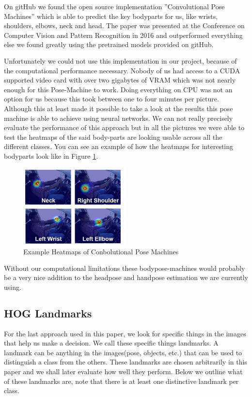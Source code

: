\documentclass[10pt,twocolumn,letterpaper]{article}
\begin{document}
On gitHub we found the open source implementation ''Convolutional Pose Machines'' which is able to predict the key bodyparts for us, like wrists, shoulders, elbows, neck and head.\cite{DBLP:journals/corr/WeiRKS16} The paper was presented at the Conference on Computer Vision and Pattern Recognition in 2016 and outperformed everything else we found greatly using the pretrained models provided on gitHub. 

Unfortunately we could not use this implementation in our project, because of the computational performance necessary. Nobody of us had access to a CUDA supported video card with over two gigabytes of VRAM which was not nearly enough for this Pose-Machine to work. Doing everything on CPU was not an option for us because this took between one to four minutes per picture. Although this at least made it possible to take a look at the results this pose machine is able to achieve using neural networks. We can not really precisely evaluate the performance of this approach but in all the pictures we were able to test the heatmaps of the said body-parts are looking usable across all the different classes. You can see an example of how the heatmaps for interesting bodyparts look like in Figure \ref{BodyPoseExample}.\\
\begin{figure}[h]
    \centering
    \includegraphics[width=0.5\textwidth]{BodyPoseExample}
    \caption{Example Heatmaps of Conbolutional Pose Machines}
    \label{BodyPoseExample}
\end{figure}

Without our computational limitations these bodypose-machines would probably be a very nice addition to the headpose and handpose estimation we are currently using.


\subsection{HOG Landmarks}

For the last approach used in this paper, we look for specific things in the images that help us make a decision. We call these specific things landmarks. A landmark can be anything in the images(pose, objects, etc.) that can be used to distinguish a class from the others. These landmarks are chosen arbitrarily in this paper and we shall later evaluate how well they perform. Below we outline what of these landmarks are, note that there is at least one distinctive landmark per class.
\end{document}
